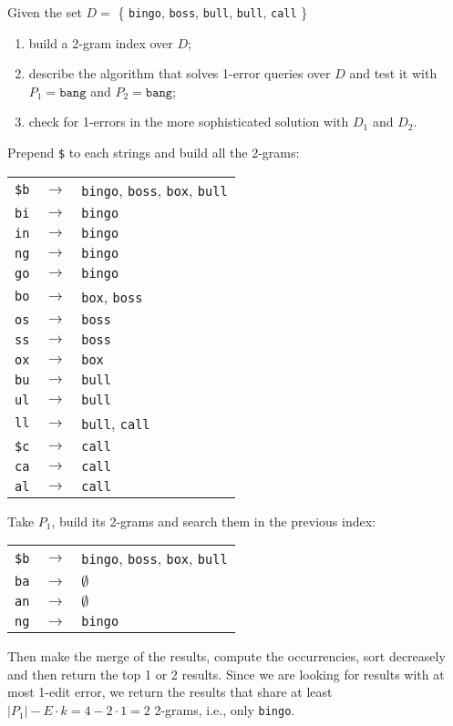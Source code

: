 \exercise

Given the set $D =$ \{ \texttt{bingo}, \texttt{boss}, \texttt{bull},
\texttt{bull}, \texttt{call} \}
%
\begin{enumerate}
  \item build a 2-gram index over $D$;
  \item describe the algorithm that solves 1-error queries over $D$ and test it
  with $P_1 = \texttt{bang}$ and $P_2 = \texttt{bang}$;
  \item check for 1-errors in the more sophisticated solution with $D_1$ and
  $D_2$.
\end{enumerate}

\solution

Prepend \texttt{\$} to each strings and build all the 2-grams:
%
\begin{longtable}{ccl}
  \texttt{\$b} & $\rightarrow$ & \texttt{bingo}, \texttt{boss},
  \texttt{box}, \texttt{bull} \\
  \texttt{bi} & $\rightarrow$ & \texttt{bingo} \\
  \texttt{in} & $\rightarrow$ & \texttt{bingo} \\
  \texttt{ng} & $\rightarrow$ & \texttt{bingo} \\
  \texttt{go} & $\rightarrow$ & \texttt{bingo} \\
  \texttt{bo} & $\rightarrow$ & \texttt{box}, \texttt{boss} \\
  \texttt{os} & $\rightarrow$ & \texttt{boss}\\
  \texttt{ss} & $\rightarrow$ & \texttt{boss} \\
  \texttt{ox} & $\rightarrow$ & \texttt{box} \\
  \texttt{bu} & $\rightarrow$ & \texttt{bull} \\
  \texttt{ul} & $\rightarrow$ & \texttt{bull} \\
  \texttt{ll} & $\rightarrow$ & \texttt{bull}, \texttt{call} \\
  \texttt{\$c} & $\rightarrow$ & \texttt{call} \\
  \texttt{ca} & $\rightarrow$ & \texttt{call} \\
  \texttt{al} & $\rightarrow$ & \texttt{call} \\
\end{longtable}
%
Take $P_1$, build its 2-grams and search them in the previous index:
%
\begin{longtable}{ccl}
  \texttt{\$b} & $\rightarrow$ & \texttt{bingo}, \texttt{boss},
  \texttt{box}, \texttt{bull} \\
  \texttt{ba} & $\rightarrow$ & $\emptyset$ \\
  \texttt{an} & $\rightarrow$ & $\emptyset$ \\
  \texttt{ng} & $\rightarrow$ & \texttt{bingo} \\
\end{longtable}
%
Then make the merge of the results, compute the occurrencies, sort decreasely
and then return the top 1 or 2 results. Since we are looking for results with at
most 1-edit error, we return the results that share at least $|P_1| - E \cdot k
= 4 - 2 \cdot 1 = 2$ 2-grams, i.e., only \texttt{bingo}.

